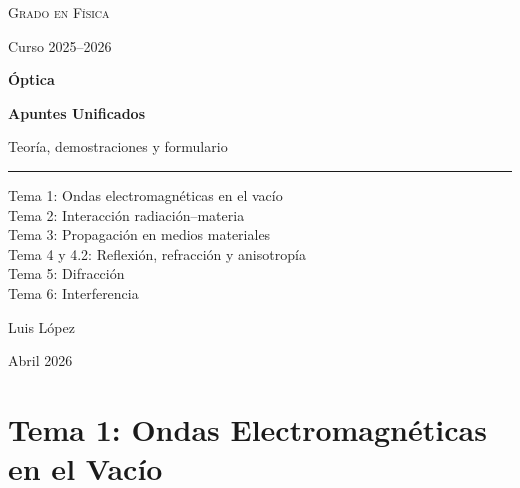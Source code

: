\documentclass[12pt, a4paper]{article}
\theoremstyle{plain}
\theoremstyle{definition}
\theoremstyle{remark}
\begin{document}
\hypersetup{pageanchor=false}
\begin{titlepage}
  \thispagestyle{empty}
  \centering
  \vspace*{2.4cm}

  {\Large\scshape Grado en Física\par}
  \vspace{0.25cm}
  {\normalsize Curso 2025--2026\par}

  \vspace{1.35cm}
  {\Huge\bfseries Óptica\par}
  \vspace{0.25cm}
  {\Large\bfseries Apuntes Unificados\par}
  \vspace{0.55cm}
  {\normalsize Teoría, demostraciones y formulario\par}

  \vspace{1.0cm}
  \rule{0.54\linewidth}{0.6pt}
  \vspace{0.95cm}

  \begin{minipage}{0.78\linewidth}
    \centering
    \normalsize
    Tema 1: Ondas electromagnéticas en el vacío\\
    Tema 2: Interacción radiación--materia\\
    Tema 3: Propagación en medios materiales\\
    Tema 4 y 4.2: Reflexión, refracción y anisotropía\\
    Tema 5: Difracción\\
    Tema 6: Interferencia
  \end{minipage}

  \vfill
  {\normalsize Luis López\par}
  \vspace{0.15cm}
  {\small Abril 2026\par}
\end{titlepage}
\hypersetup{pageanchor=true}

\tableofcontents

\section{Tema 1: Ondas Electromagnéticas en el Vacío}
\end{document}

